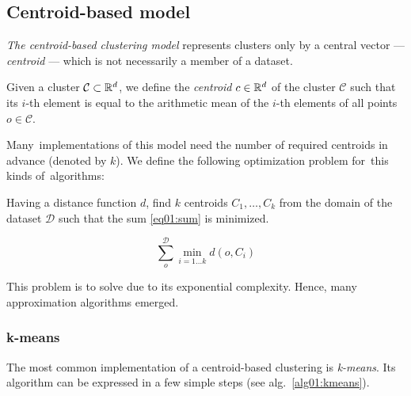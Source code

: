 \subsection{Centroid-based model}

\emph{The centroid-based clustering model} represents clusters only by a central vector --- \clen\emph{centroid} --- which is not necessarily a member of a dataset.

\begin{defn}[Centroid]
	Given a cluster $\mathcal{C} \subset \mathbb{R}^d$, we define the \emph{centroid} $c \in \mathbb{R}^d$ of the cluster $\mathcal{C}$ such that its $i$-th element is equal to the arithmetic mean of the $i$-th elements of all points $o \in \mathcal{C}$. 
	\label{def01:centr}
\end{defn}

Many~implementations of this model need the number of required centroids in advance (denoted by $k$). We define the following optimization problem for~this kinds of~algorithms: 

\begin{problem}
	Having a distance function $d$, find $k$ centroids $C_1,\dots,C_k$ from the domain of the dataset $\mathcal{D}$ such that the sum \ref{eq01:sum}
	is minimized.
\end{problem}

\begin{equation}\label{eq01:sum}
	\sum_o^{\mathcal{D}} \min_{i=1\dots k}d(o,C_i)
\end{equation}

This problem is  to solve due to its exponential complexity. Hence, many approximation algorithms emerged. 

\subsubsection{k-means}

The most common implementation of a centroid-based clustering is \emph{k-means}. Its algorithm can be expressed in a few simple steps (see alg.~\ref{alg01:kmeans}).

